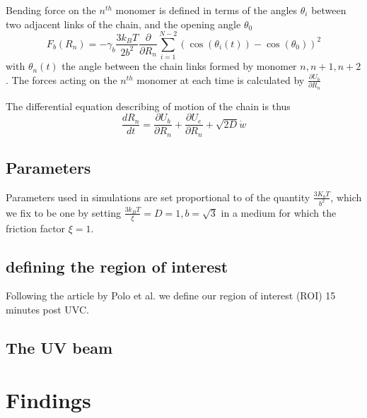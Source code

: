 \documentclass[12pt]{report}
\begin{document}
     Bending force on the $n^{th}$ monomer is defined in terms of the angles $\theta_i$ between two adjacent links of the chain, and the opening angle $\theta_0$
     \begin{equation*}
     F_b(R_n) = -\gamma_b\frac{3k_BT}{2b^2}\frac{\partial}{\partial R_n}\sum_{i=1}^{N-2}(\cos(\theta_i(t))-\cos(\theta_0))^2
     \end{equation*}
     with $\theta_n(t)$ the angle between the chain links formed by monomer $n,n+1,n+2$.
     The forces acting on the $n^{th}$ monomer at each time is calculated by $\frac{\partial U_b}{\partial R_n}$
     
     The differential equation describing of motion of the chain is thus 
     \begin{equation*}
     \frac{dR_n}{dt}= \frac{\partial U_b}{\partial R_n} +\frac{\partial U_e}{\partial R_n} +\sqrt{2D} \dot{w}     
     \end{equation*}
     
     \subsection{Parameters}
     Parameters used in simulations are set proportional to of the quantity $\frac{3K_bT}{b^2}$, which we fix to be one by setting $\frac{3k_BT}{\xi}=D=1, b=\sqrt{3}$ in a medium for which the friction factor $\xi=1$. 

	\subsection{defining the region of interest}
	Following the article by Polo et al. we define our region of interest (ROI) 15 minutes post UVC. 
    \subsection{The UV beam}
    
	
	
	\section{Findings}
	
	
	
\end{document}
